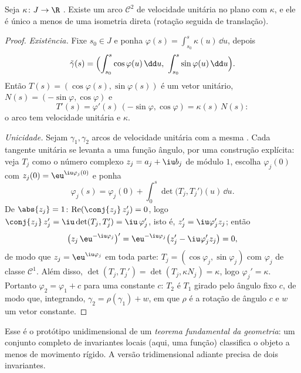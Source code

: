\begin{theorem}\label{thm:b2:curves:fundamental}
Seja $\kappa \colon J \to \R$ . Existe um
arco $\mathcal{C}^2$ de velocidade unitária no plano com 
$\kappa$, e ele é único a menos de uma isometria direta (rotação
seguida de translação).
\end{theorem}

\begin{proof}
\emph{Existência.} Fixe $s_0 \in J$ e ponha $\varphi(s) =
\int_{s_0}^s \kappa(u)\,\dd u$, depois
\[
\tilde\gamma(s) = \Bigl(\int_{s_0}^s \cos\varphi(u)\,\dd u,\
\int_{s_0}^s \sin\varphi(u)\,\dd u\Bigr).
\]
Então $T(s) = (\cos\varphi(s), \sin\varphi(s))$ é um vetor unitário,
$N(s) = (-\sin\varphi, \cos\varphi)$ e
\[
T'(s) = \varphi'(s)\,(-\sin\varphi, \cos\varphi)
= \kappa(s)\,N(s) :
\]
o arco tem velocidade unitária e  $\kappa$.

\emph{Unicidade.} Sejam $\gamma_1, \gamma_2$ arcos de velocidade unitária com
a mesma \omterm{thm:b2:curves:frenet2d}{curvatura}. Cada tangente unitária se levanta a uma função
ângulo, por uma construção explícita: veja $T_j$ como o
número complexo $z_j = a_j + \iu b_j$ de módulo $1$, escolha
$\varphi_j(0)$ com $z_j(0) = \eu^{\iu\varphi_j(0)}$ e ponha
\[
\varphi_j(s) = \varphi_j(0) + \int_0^s\det\bigl(T_j,
T_j'\bigr)(u)\,\dd u .
\]
De $\abs{z_j} = 1$: $\operatorname{Re}(\conj{z_j}\,z_j') =
0$, logo $\conj{z_j}\,z_j' = \iu\det(T_j, T_j') =
\iu\,\varphi_j'$, isto é, $z_j' = \iu\varphi_j'z_j$; então
\[
\bigl(z_j\,\eu^{-\iu\varphi_j}\bigr)'
= \eu^{-\iu\varphi_j}\bigl(z_j' - \iu\varphi_j'z_j\bigr) = 0,
\]
de modo que $z_j = \eu^{\iu\varphi_j}$ em toda parte: $T_j =
(\cos\varphi_j, \sin\varphi_j)$ com $\varphi_j$ de classe
$\mathcal C^1$. Além disso, $\det(T_j, T_j') = \det(T_j,
\kappa N_j) = \kappa$, logo $\varphi_j' = \kappa$. Portanto $\varphi_2 = \varphi_1 + c$ para uma
constante $c$: $T_2$ é $T_1$ girado pelo ângulo fixo $c$, de modo que,
integrando, $\gamma_2 = \rho(\gamma_1) + w$, em que $\rho$ é a
rotação de ângulo $c$ e $w$ um vetor constante.
\end{proof}

\begin{remark}
Esse é o protótipo unidimensional de um \emph{teorema fundamental
da geometria}: um conjunto completo de invariantes locais (aqui, uma
função) classifica o objeto a menos de movimento rígido. A
versão tridimensional adiante precisa de dois invariantes.
\end{remark}

